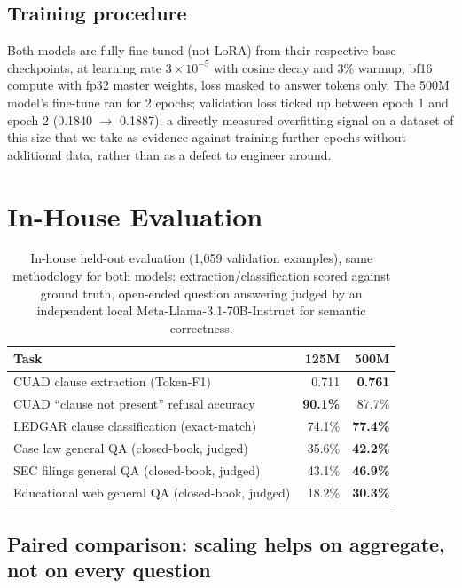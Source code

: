 \documentclass[11pt]{article}
\begin{document}
\subsection{Training procedure}

Both models are fully fine-tuned (not LoRA) from their respective base
checkpoints, at learning rate $3\times10^{-5}$ with cosine decay and 3\%
warmup, bf16 compute with fp32 master weights, loss masked to answer
tokens only. The 500M model's fine-tune ran for 2 epochs; validation loss
ticked up between epoch 1 and epoch 2 (0.1840 $\to$ 0.1887), a directly
measured overfitting signal on a dataset of this size that we take as
evidence against training further epochs without additional data, rather
than as a defect to engineer around.

\section{In-House Evaluation}

\begin{table}[h]
\centering
\caption{In-house held-out evaluation (1{,}059 validation examples),
same methodology for both models: extraction/classification scored
against ground truth, open-ended question answering judged by an
independent local Meta-Llama-3.1-70B-Instruct for semantic correctness.}
\label{tab:inhouse}
\begin{tabular}{lrr}
\toprule
\textbf{Task} & \textbf{125M} & \textbf{500M} \\
\midrule
CUAD clause extraction (Token-F1) & 0.711 & \textbf{0.761} \\
CUAD ``clause not present'' refusal accuracy & \textbf{90.1\%} & 87.7\% \\
LEDGAR clause classification (exact-match) & 74.1\% & \textbf{77.4\%} \\
Case law general QA (closed-book, judged) & 35.6\% & \textbf{42.2\%} \\
SEC filings general QA (closed-book, judged) & 43.1\% & \textbf{46.9\%} \\
Educational web general QA (closed-book, judged) & 18.2\% & \textbf{30.3\%} \\
\bottomrule
\end{tabular}
\end{table}

\subsection{Paired comparison: scaling helps on aggregate, not on every question}
\label{sec:paired}
\end{document}
